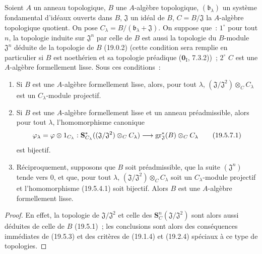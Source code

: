 \begin{corollary}[19.5.7]
\label{0.19.5.7-fr}
Soient $A$ un anneau topologique, $B$ une $A$-algèbre topologique,
$(\mathfrak b_\lambda)$ un système fondamental d'idéaux ouverts dans $B$,
$\mathfrak J$ un idéal de $B$, $C=B/\mathfrak J$ la $A$-algèbre topologique
quotient. On pose $C_\lambda=B/(\mathfrak b_\lambda+\mathfrak J)$. On suppose
que~: $1^\circ$ pour tout $n$, la topologie induite sur $\mathfrak J^n$ par
celle de $B$ est aussi la topologie du $B$-module $\mathfrak J^n$ déduite de
la topologie de $B$ (19.0.2) (cette condition sera remplie en particulier si
$B$ est noethérien et sa topologie préadique ($\mathbf 0_{\mathrm I}$,
7.3.2))~; $2^\circ$ $C$ est une $A$-algèbre formellement lisse. Sous ces
conditions~:
\begin{enumerate}
  \item[\rm(i)] Si $B$ est une $A$-algèbre formellement lisse, alors, pour tout
  $\lambda$, $(\mathfrak J/\mathfrak J^2)\otimes_C C_\lambda$ est un
  $C_\lambda$-module projectif.
  \item[\rm(ii)] Si $B$ est une $A$-algèbre formellement lisse et un anneau
  préadmissible, alors pour tout $\lambda$, l'homomorphisme canonique
  \begin{equation}
  \label{0.19.5.7.1-fr}
    \varphi_\lambda=\varphi\otimes 1_{C_\lambda}:
    \mathbf S_{C_\lambda}^*((\mathfrak J/\mathfrak J^2)\otimes_C C_\lambda)
    \longrightarrow\operatorname{gr}_{\mathfrak J}^*(B)\otimes_C C_\lambda
    \tag{19.5.7.1}
  \end{equation}
  est bijectif.


  \item[\rm(iii)] Réciproquement, supposons que $B$ soit préadmissible, que la
  suite $(\mathfrak J^n)$ tende vers $0$, et que, pour tout $\lambda$,
  $(\mathfrak J/\mathfrak J^2)\otimes_C C_\lambda$ soit un $C_\lambda$-module
  projectif et l'homomorphisme (19.5.4.1) soit bijectif. Alors $B$ est une
  $A$-algèbre formellement lisse.
\end{enumerate}
\end{corollary}

\begin{proof}
En effet, la topologie de $\mathfrak J/\mathfrak J^2$ et celle des
$\mathbf S_C^n(\mathfrak J/\mathfrak J^2)$ sont alors aussi déduites de celle
de $B$ (19.5.1)~; les conclusions sont alors des conséquences immédiates de
(19.5.3) et des critères de (19.1.4) et (19.2.4) spéciaux à ce type de
topologies.
\end{proof}

